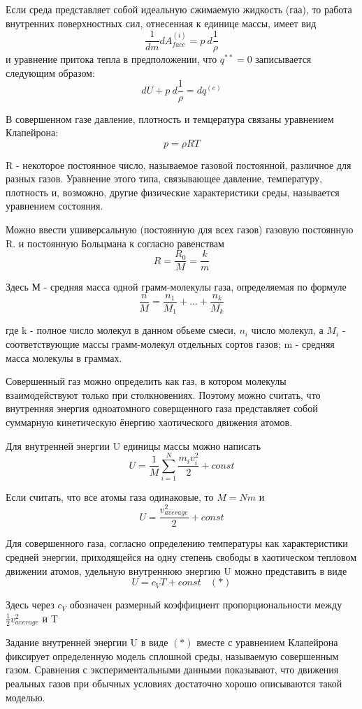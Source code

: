 Если среда представляет собой идеальную сжимаемую жидкость (гаа), то работа внутренних поверхностных сил, отнесенная к единице массы, имеет вид
$$ \frac{1}{dm}dA_{face}^{(i)} = p\ d\frac{1}{\rho} $$
и уравнение притока тепла в предположении, что $q^{**} = 0$ записывается следующим образом:
$$ dU + p\ d\frac{1}{\rho} = dq^{(e)} $$

В совершенном газе давление, плотность и темцература связаны уравнением Клапейрона:
$$ p = \rho R T $$

R - некоторое постоянное число, называемое газовой постоянной, различное для разных газов. Уравнение этого типа, связывающее давление, температуру, плотность и, возможно, другие физические характеристики среды, называется уравнением состояния.

Можно ввести ушиверсальную (постоянную для всех газов) газовую постоянную R. и постоянную Больцмана к согласно равенствам
$$ R = \frac{R_0}{M} = \frac{k}{m} $$

Здесь М - средняя масса одной грамм-молекулы газа, определяемая по формуле
$$ \frac{n}{M} = \frac{n_1}{M_1} + ... + \frac{n_k}{M_k} $$

где k - полное число молекул в данном обьеме смеси,  $n_i$ число молекул, а $M_i$ - соответствующие массы грамм-молекул отдельных сортов газов; m - средняя масса молекулы в граммах.

Совершенный газ можно определить как газ, в котором молекулы взаимодействуют только при столкновениях. Поэтому можно считать, что внутренняя энергия одноатомного соверщенного газа представляет собой суммарную кинетическую ёнергию хаотического движения атомов.

Для внутренней энергии U единицы массы можно написать
$$ U = \frac{1}{M}\sum\limits_{i=1}^{N}\frac{m_iv_i^2}{2} + const $$

Если считать, что все атомы газа одинаковые, то $M = Nm$ и
$$ U = \frac{v_{average}^2}{2} + const $$

Для совершенного газа, согласно определению температуры как характеристики средней энергии, приходящейся на одну степень свободы в хаотическом тепловом движении атомов, удельную внутреннюю энергию U можно представить в виде
$$ U = c_VT + const \ \ \ \ (*)$$

Здесь через $c_V$ обозначен размерный коэффициент пропорциональности между $\frac{1}{2}v_{average}^2$ и T

Задание внутренней энергии U в виде $(*)$ вместе с уравнением Клапейрона фиксирует определенную модель сплошной среды, называемую совершенным газом. Сравнения с экспериментальными данными показывают, что движения реальных газов при обычных условиях достаточно хорошо описываются такой моделью.

